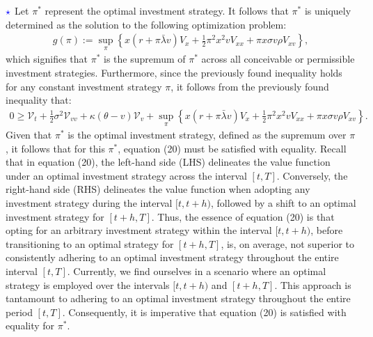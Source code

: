 \documentclass[11pt]{article}
\numberwithin{equation}{section}
\begin{document}
$\textcolor{blue}{\star}$ Let $\pi^*$ represent the optimal investment strategy. It follows that $\pi^*$ is uniquely determined as the solution to the following optimization problem:
\begin{align*}
    g(\pi):=\sup_\pi \left\{ x\left(r + \pi\bar{\lambda}v\right)V_x + \frac{1}{2}\pi^2x^2vV_{xx} + \pi x \sigma v \rho V_{xv} \right\},
\end{align*}
which signifies that $\pi^*$ is the supremum of $\pi^*$ across all conceivable
or permissible investment strategies. Furthermore, since the previously found
inequality holds for any constant investment strategy $\pi$, it follows from the
previously found inequality that:
\begin{align*}
    0\geq \mathcal{V}_t + \frac{1}{2}\sigma^2 \mathcal{V}_{vv}+\kappa(\theta-v)\mathcal{V}_v+\sup_\pi \left\{ x\left(r + \pi\bar{\lambda}v\right)V_x + \frac{1}{2}\pi^2x^2vV_{xx} + \pi x \sigma v \rho V_{xv} \right\}.
\end{align*}
Given that $\pi^*$ is the optimal investment strategy, defined as the supremum
over $\pi$, it follows that for this $\pi^*$, equation (20) must be satisfied
with equality. Recall that in equation (20), the left-hand side (LHS) delineates the value function under
an optimal investment strategy across the interval $[t, T]$. Conversely, the
right-hand side (RHS) delineates the value function when adopting any investment
strategy during the interval $[t, t + h)$, followed by a shift to an optimal
investment strategy for $[t + h, T]$. Thus, the essence of equation (20) is
that opting for an arbitrary investment strategy within the interval $[t, t+h)$,
before transitioning to an optimal strategy for $[t+h, T]$, is, on average, not
superior to consistently adhering to an optimal investment strategy throughout
the entire interval $[t, T]$. Currently, we find ourselves in a scenario where
an optimal strategy is employed over the intervals $[t, t + h)$ and $[t + h,
T]$. This approach is tantamount to adhering to an optimal investment strategy
throughout the entire period $[t, T]$. Consequently, it is imperative that
equation (20) is satisfied with equality for $\pi^*$.
\end{document}
